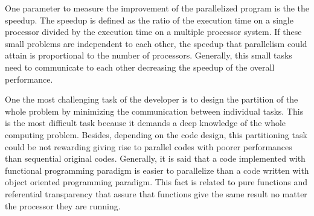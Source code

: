 One parameter to measure the improvement of the parallelized program is the the speedup. 
The speedup is defined as the ratio of the execution time on a single processor divided by 
the execution time on a multiple processor system. 
If these small problems are independent to each other, the speedup that parallelism could attain 
is proportional to the number of processors. 
Generally, this small tasks need to communicate to each other decreasing the speedup of the 
overall performance. 

One the most challenging task of the developer is to design the partition of the 
whole problem by minimizing the communication between individual tasks.  
This is the most difficult task because it demands a deep knowledge of the whole computing 
problem. Besides, depending on the code design, this partitioning task could be not rewarding 
giving rise to parallel codes with poorer performances than sequential original codes. 
Generally, it is said that a code implemented with functional programming paradigm is easier to 
parallelize than a code written with object oriented programming paradigm. 
This fact is related to pure functions and referential transparency that 
assure that functions give the same result no matter the processor they are running. 


               
